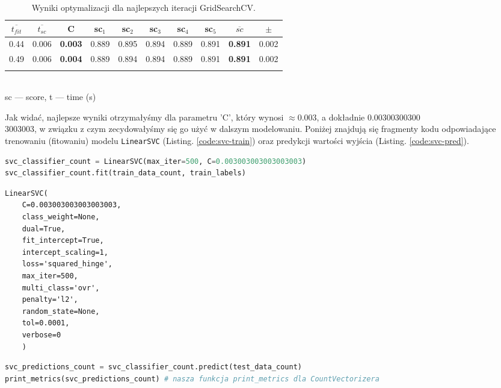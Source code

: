 \bigskip
\begin{table} [H]
	\caption{Wyniki optymalizacji dla najlepszych iteracji GridSearchCV.}
	\begin{center}
		\begin{tabular}{c  c || c || c  c  c  c  c  || c  || c }
			\hline
			$\overline{t_{fit}}$&$\overline{t_{sc}}$ &\textbf{C} &	sc$_1$&	sc$_2$ &sc$_3$ &	sc$_4$ &	sc$_5$	& \textbf{$\overline{sc}$ }&	$\pm$	\\
			\hline
			0.44&	0.006&	\textbf{0.003}&	0.889 &	0.895 &	0.894 &	0.889&	0.891&	\textbf{0.891}&	0.002 \\
			0.49&	0.006&	\textbf{0.004}&	0.889 &	0.894 &	0.894 &	0.889&	0.891&	\textbf{0.891}&	0.002 \\\\
			\hline
		\end{tabular} \\
		{\scriptsize sc --- score, t --- time (s)}
	\end{center}
\end{table}

\noindent Jak widać, najlepsze wyniki otrzymałyśmy dla parametru 'C', który wynosi $\approx$0.003, a dokładnie 0.00300300300\\3003003, w związku z czym zecydowałyśmy się go użyć w dalszym modelowaniu.
Poniżej znajdują się fragmenty kodu odpowiadające trenowaniu (fitowaniu) modelu \verb|LinearSVC| (Listing. \ref{code:svc-train}) oraz predykcji wartości wyjścia (Listing. \ref{code:svc-pred}).

\bigskip

\begin{lstlisting}[language=Python,frame=single, breaklines=true, caption=Trening SVC dla C 0.003003003003003003.,label=code:svc-train]
svc_classifier_count = LinearSVC(max_iter=500, C=0.003003003003003003)
svc_classifier_count.fit(train_data_count, train_labels)
\end{lstlisting}

\bigskip
\begin{Verbatim}
LinearSVC(
	C=0.003003003003003003,
	class_weight=None,
	dual=True,
	fit_intercept=True, 
	intercept_scaling=1,
	loss='squared_hinge', 
	max_iter=500, 
	multi_class='ovr', 
	penalty='l2', 
	random_state=None, 
	tol=0.0001, 
	verbose=0
	)
\end{Verbatim}

\bigskip
\begin{lstlisting}[language=Python,frame=single, breaklines=true, caption=Predykcja SVC dla C 0.003003003003003003.,label=code:svc-pred]
svc_predictions_count = svc_classifier_count.predict(test_data_count)
print_metrics(svc_predictions_count) # nasza funkcja print_metrics dla CountVectorizera
\end{lstlisting}

